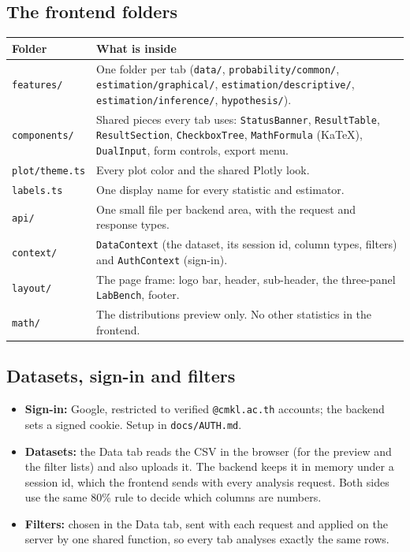 \documentclass[11pt,a4paper]{article}
\newcommand{\f}[1]{\texttt{#1}}
\begin{document}
\subsection{The frontend folders}
\begin{center}
\begin{tabularx}{\textwidth}{@{}>{\raggedright\arraybackslash}p{3.3cm}L@{}}
\toprule
\textbf{Folder} & \textbf{What is inside} \\
\midrule
\f{features/} & One folder per tab (\f{data/}, \f{probability/common/}, \f{estimation/graphical/}, \f{estimation/descriptive/}, \f{estimation/inference/}, \f{hypothesis/}). \\
\f{components/} & Shared pieces every tab uses: \f{StatusBanner}, \f{ResultTable}, \f{ResultSection}, \f{CheckboxTree}, \f{MathFormula} (KaTeX), \f{DualInput}, form controls, export menu. \\
\f{plot/theme.ts} & Every plot color and the shared Plotly look. \\
\f{labels.ts} & One display name for every statistic and estimator. \\
\f{api/} & One small file per backend area, with the request and response types. \\
\f{context/} & \f{DataContext} (the dataset, its session id, column types, filters) and \f{AuthContext} (sign-in). \\
\f{layout/} & The page frame: logo bar, header, sub-header, the three-panel \f{LabBench}, footer. \\
\f{math/} & The distributions preview only. No other statistics in the frontend. \\
\bottomrule
\end{tabularx}
\end{center}

\subsection{Datasets, sign-in and filters}
\begin{itemize}
\item \textbf{Sign-in:} Google, restricted to verified \f{@cmkl.ac.th} accounts; the backend sets a signed
  cookie. Setup in \f{docs/AUTH.md}.
\item \textbf{Datasets:} the Data tab reads the CSV in the browser (for the preview and the filter lists) and
  also uploads it. The backend keeps it in memory under a session id, which the frontend sends with every
  analysis request. Both sides use the same 80\% rule to decide which columns are numbers.
\item \textbf{Filters:} chosen in the Data tab, sent with each request and applied on the server by one shared
  function, so every tab analyses exactly the same rows.
\end{itemize}
\end{document}
